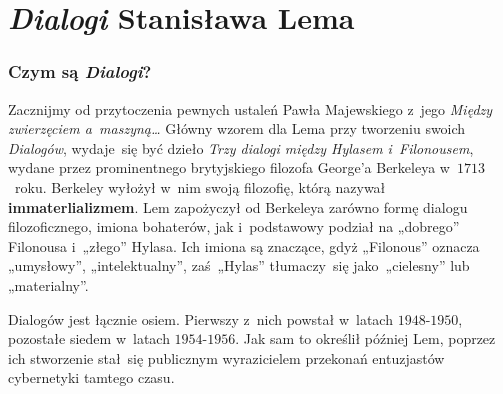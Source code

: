 \documentclass[10pt,t]{beamer}
\begin{document}
\section{\textit{Dialogi} Stanisława Lema}



\begin{frame}
  \frametitle{Czym są \textit{Dialogi}?}


  Zacznijmy od przytoczenia pewnych ustaleń Pawła Majewskiego z~jego
  \textit{Między zwierzęciem a~maszyną\ldots} Główny wzorem dla Lema przy
  tworzeniu swoich \textit{Dialogów}, wydaje~się być dzieło \textit{Trzy
    dialogi między Hylasem i~Filonousem}, wydane przez prominentnego
  brytyjskiego filozofa
  {George’a Berkeleya} w~$1713$~roku. Berkeley wyłożył w~nim swoją
  filozofię, którą nazywał \textbf{immaterlializmem}. Lem zapożyczył od
  Berkeleya zarówno formę dialogu filozoficznego, imiona bohaterów, jak
  i~podstawowy podział na „dobrego” Filonousa i~„złego” Hylasa. Ich imiona
  są znaczące, gdyż „Filonous” oznacza „umysłowy”, „intelektualny”,
  zaś~„Hylas” tłumaczy~się jako~„cielesny” lub „materialny”.

  Dialogów jest łącznie osiem. Pierwszy z~nich powstał w~latach
  $1948\text{-}1950$, pozostałe siedem w~latach $1954\text{-}1956$. Jak sam
  to określił później Lem, poprzez ich stworzenie stał~się publicznym
  wyrazicielem przekonań entuzjastów cybernetyki tamtego czasu.

\end{frame}
\end{document}
